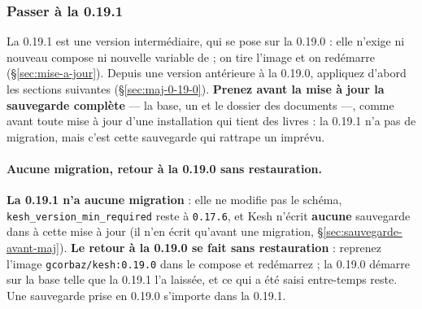 \documentclass[a4paper,11pt,oneside]{article}
\begin{document}
\fussy

\subsubsection{Passer à la 0.19.1}\label{sec:maj-0-19-1}
\sloppy

La 0.19.1 est une version intermédiaire, qui se pose sur la 0.19.0 : elle n'exige ni nouveau compose ni nouvelle variable de  ; on tire l'image et on redémarre (\S\ref{sec:mise-a-jour}). Depuis une version antérieure à la 0.19.0, appliquez d'abord les sections suivantes (\S\ref{sec:maj-0-19-0}). \textbf{Prenez avant la mise à jour la sauvegarde complète} --- la base, un  et le dossier des documents ---, comme avant toute mise à jour d'une installation qui tient des livres : la 0.19.1 n'a pas de migration, mais c'est cette sauvegarde qui rattrape un imprévu.

\paragraph{Aucune migration, retour à la 0.19.0 sans restauration.} \textbf{La 0.19.1 n'a aucune migration} : elle ne modifie pas le schéma, \texttt{kesh\_version\_min\_required} reste à \texttt{0.17.6}, et Kesh n'écrit \textbf{aucune} sauvegarde dans  à cette mise à jour (il n'en écrit qu'avant une migration, \S\ref{sec:sauvegarde-avant-maj}). \textbf{Le retour à la 0.19.0 se fait sans restauration} : reprenez l'image \texttt{gcorbaz/kesh:0.19.0} dans le compose et redémarrez ; la 0.19.0 démarre sur la base telle que la 0.19.1 l'a laissée, et ce qui a été saisi entre-temps reste. Une sauvegarde  prise en 0.19.0 s'importe dans la 0.19.1.
\end{document}
